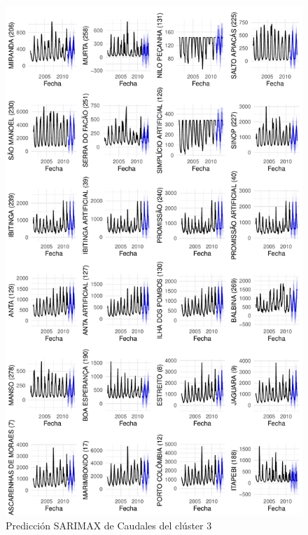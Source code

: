 \documentclass[12pt,oneside]{book}\usepackage[]{graphicx}\usepackage[]{color}
\makeatletter
\def\maxwidth{ %
  \ifdim\Gin@nat@width>\linewidth
    \linewidth
  \else
    \Gin@nat@width
  \fi
}
\newenvironment{knitrout}{}{} %
\theoremstyle{definition} %
\makeatother
\begin{document}
\begin{knitrout}
\color{fgcolor}\begin{figure}[h]

{\centering \includegraphics[width=\maxwidth,height=0.85\textheight]{figure/unnamed-chunk-113-1} 

}

\caption{\label{fig:pred_clx3_2} Predicción SARIMAX de Caudales del clúster 3}\label{fig:unnamed-chunk-113}
\end{figure}


\end{knitrout}
\end{document}

